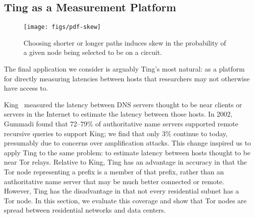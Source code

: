 
\subsection{Ting as a Measurement Platform} %
\label{sec:ting-msmt-platform}


\begin{figure}[t!]
\centering

\texttt{[image: figs/pdf-skew]}
\caption{\label{fig:pdf-skew} Choosing shorter or longer paths
induces skew in the probability of a given node being selected to
be on a circuit.}

\end{figure}



The final application we consider is arguably Ting's most natural: as a
platform for directly measuring latencies between hosts that
researchers may not otherwise have access to.

King~\cite{king} measured the latency between DNS servers
thought to be near clients or servers in the Internet to
estimate the latency between those hosts.  In 2002, Gummadi
\etal{} found that 72--79\% of authoritative name servers
supported remote recursive queries to support King; we find that only 3\%
continue to today, presumably due to concerns over
amplification attacks.  This change inspired us to apply Ting to
the same problem: to estimate latency between hosts thought to
be near Tor relays.  Relative to King, Ting has an
advantage in accuracy in that the Tor node representing a
prefix is a member of that prefix, rather than an
authoritative name server that may be much better connected
or remote.  However, Ting has the disadvantage in that not
every residential subnet has a Tor node.  In this section, 
we evaluate this coverage and show that Tor nodes are 
spread between residential networks and data centers.


